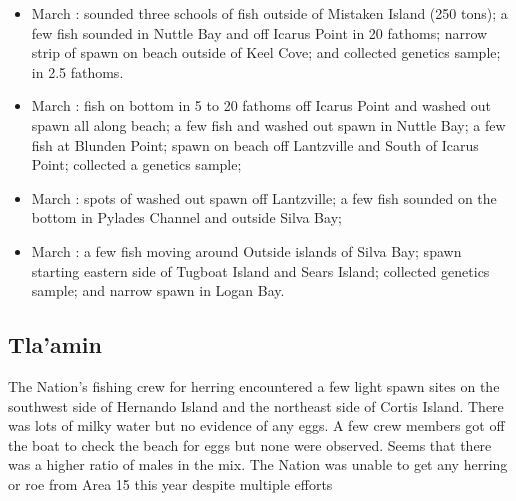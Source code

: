 \begin{itemize}
\item March : sounded three schools of fish
outside of Mistaken Island (250 tons);
a few fish sounded in Nuttle Bay and off Icarus Point in 20 fathoms;
narrow strip of spawn on beach outside of Keel Cove; and
collected genetics sample; in 2.5 fathoms.

\item March : fish on bottom in 5 to 20 fathoms off Icarus Point and
washed out spawn all along beach;
a few fish and washed out spawn in Nuttle  Bay;
a few fish at Blunden Point;
spawn on beach off Lantzville and South of Icarus Point;
collected a genetics sample;

\item March : spots of washed out spawn off Lantzville;
a few fish sounded on the bottom in Pylades Channel and outside Silva Bay;

\item March : a few fish moving around Outside islands of Silva Bay;
spawn starting eastern side of Tugboat Island and Sears Island;
collected genetics sample; and
narrow spawn in Logan Bay.

\end{itemize}

\subsection{Tla'amin}

The Nation's fishing crew for herring encountered a few light spawn sites on the
southwest side of Hernando Island and the northeast side of Cortis Island.
There was lots of milky water but no evidence of any eggs.
A few crew members got off the boat to check the beach for eggs
but none were observed. 
Seems that there was a higher ratio of males in the mix.
The Nation was unable to get any herring or roe
from Area 15 this year despite multiple efforts
